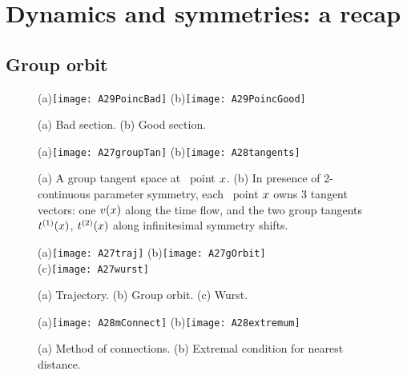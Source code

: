 
\section{Dynamics and symmetries: a recap}
\label{s:cut}

\subsection{Group orbit}


    \ifdraft\color{blue}
\begin{figure}
   \centering
(a)\texttt{[image: A29PoincBad]}
(b)\texttt{[image: A29PoincGood]}
   \caption{\label{fig:A29PoincBad}
    (a)
Bad section.
    (b)
Good section.
}
\end{figure}

\begin{figure}
   \centering
(a)\texttt{[image: A27groupTan]}
(b)\texttt{[image: A28tangents]}
   \caption{\label{fig:tangents}
    (a)
A group tangent space at \statesp\ point $x$.
    (b)
In presence of 2-continuous parameter symmetry, each \statesp\ point
$x$ owns 3 tangent vectors: one $v(x)$ along the time flow, and
the two group tangents $t^{(1)}(x)$, $t^{(2)}(x)$
along infinitesimal symmetry shifts.
}
\end{figure}

\begin{figure}
   \centering
(a)\texttt{[image: A27traj]}
(b)\texttt{[image: A27gOrbit]}
    \\
(c)\texttt{[image: A27wurst]}
   \caption{\label{fig:A27wurst}
    (a)
Trajectory.
    (b)
Group orbit.
    (c)
Wurst.
}
\end{figure}

\begin{figure}
   \centering
(a)\texttt{[image: A28mConnect]}
(b)\texttt{[image: A28extremum]}
   \caption{\label{fig:A28extremum}
    (a)
Method of connections.
    (b)
Extremal condition for nearest distance.
}
\end{figure}


